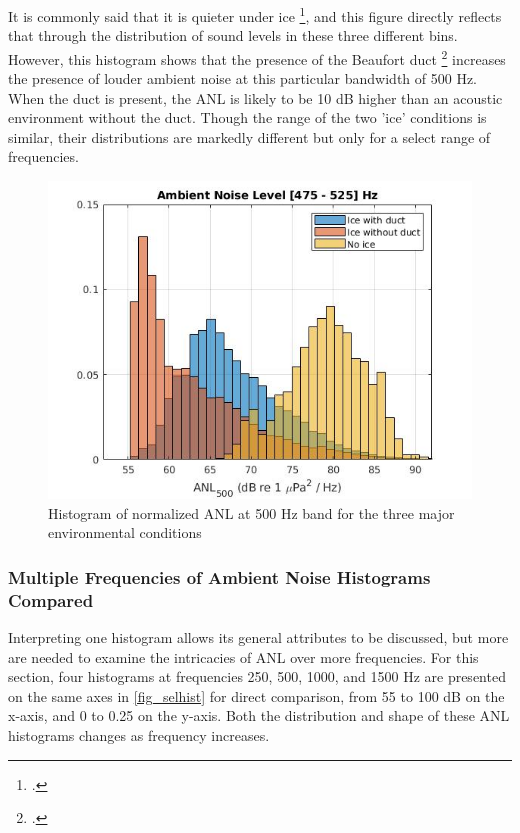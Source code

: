 It is commonly said that it is quieter under ice \footcite[]{ice_environ2}, and this figure directly reflects that through the distribution of sound levels in these three different bins. However, this histogram shows that the presence of the Beaufort duct \footcite[]{beaufortduct} increases the presence of louder ambient noise at this particular bandwidth of 500 Hz. When the duct is present, the ANL is likely to be 10 dB higher than an acoustic environment without the duct. Though the range of the two 'ice' conditions is similar, their distributions are markedly different but only for a select range of frequencies. %


\begin{figure}[h]
\centering
\includegraphics[scale=0.6]{Figures/ANL_500.jpg}
\caption{Histogram of normalized ANL at 500 Hz band for the three major environmental conditions}
\label{fig_hist500}
\end{figure}


\subsubsection{Multiple Frequencies of Ambient Noise Histograms Compared}
Interpreting one histogram allows its general attributes to be discussed, but more are needed to examine the intricacies of ANL over more frequencies.  For this section, four histograms at frequencies 250, 500, 1000, and 1500 Hz are presented on the same axes in \autoref{fig_selhist} for direct comparison, from 55 to 100 dB on the x-axis, and 0 to 0.25 on the y-axis. Both the distribution and shape of these ANL histograms changes as frequency increases. 

